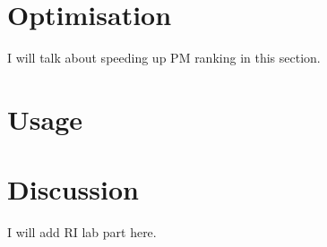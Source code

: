 \section{Optimisation}

I will talk about speeding up PM ranking in this section.

\section{Usage}

\section{Discussion}
\label{system:discuss}

I will add RI lab part here.

%
%
%
